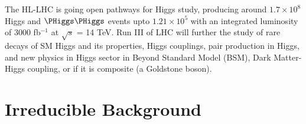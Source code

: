 \documentclass[12pt]{report}
\begin{document}
The HL-LHC is going open pathways for Higgs study, producing around $1.7 \times 10^8$ Higgs and $\PHiggs \PHiggs$ events upto $1.21 \times 10^5$ with an integrated luminosity of 3000 fb$^{-1}$ at $\sqrt{s}$ = 14 TeV. Run III of LHC will further the study of rare decays of SM Higgs and its properties, Higgs couplings, pair production in Higgs, and new physics in Higgs sector in Beyond Standard Model (BSM), Dark Matter-Higgs coupling, or if it is composite (a Goldstone boson).





\appendix
\chapter{Irreducible Background}

\end{document}
